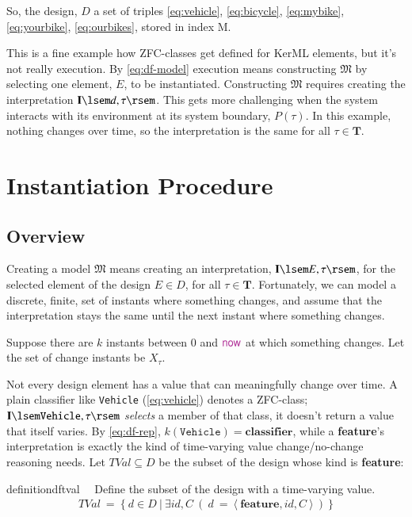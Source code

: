 So, the design, $D$ a set of triples \ref{eq:vehicle}, \ref{eq:bicycle}, \ref{eq:mybike}, \ref{eq:yourbike}, \ref{eq:ourbikes}, stored in index M.

This is a fine example how ZFC-classes get defined for KerML elements, but it's not really execution.  By \ref{eq:df-model} execution means constructing $\mathfrak{M}$ by selecting one element, $E$, to be instantiated.  Constructing $\mathfrak{M}$ requires creating the interpretation $\mathbf{I}\lsem d,\tau\rsem$.  This gets more challenging when the system interacts with its environment at its system boundary, $P(\tau)$.
In this example, nothing changes over time, so the interpretation is the same for all $\tau\in\textbf{T}$.  

\section{Instantiation Procedure}

\subsection{Overview}

Creating a model $\mathfrak{M}$ means creating an interpretation, $\mathbf{I}\lsem E,\tau\rsem$, for the selected element of the design $E\in D$, for all $\tau\in\mathbf{T}$.
Fortunately, we can model a discrete, finite, set of instants where something changes, and assume that the interpretation stays the same until the next instant where something changes.

Suppose there are $k$ instants between $0$ and $\mathsf{\mc{now}}$ at which something changes.  Let the set of change instants be $X_\tau$.

\pn Not every design element has a value that can meaningfully change over time.  A plain classifier
like \texttt{Vehicle} (\ref{eq:vehicle}) denotes a ZFC-class; $\mathbf{I}\lsem\texttt{Vehicle},\tau\rsem$
\emph{selects} a member of that class, it doesn't return a value that itself varies.  By \ref{eq:df-rep},
$k(\texttt{Vehicle})=\textbf{classifier}$, while a \textbf{feature}'s interpretation is exactly the kind
of time-varying value change/no-change reasoning needs.  Let $\mathit{TVal}\subseteq D$ be the subset of
the design whose kind is \textbf{feature}:

\begin{restatable}{definition}{dftval}~~ Define the subset of the design with a time-varying value.
\begin{gather}
\mathit{TVal}~=~\{~d\in D~\vert~\exists id,C~(~d~=~\langle~\textbf{feature},id,C~\rangle~)~\}
\label{eq:df-tval}\tag{df-tval}
\end{gather}
\end{restatable}

